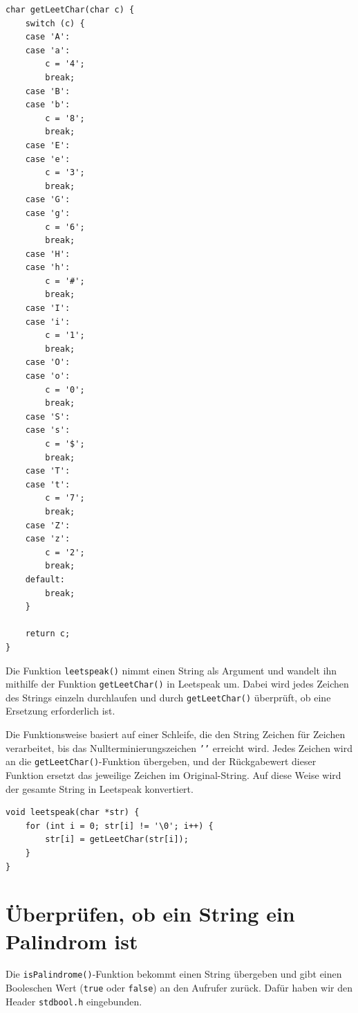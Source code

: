 \begin{verbatim}
char getLeetChar(char c) {
    switch (c) {
    case 'A':
    case 'a':
        c = '4';
        break;
    case 'B':
    case 'b':
        c = '8';
        break;
    case 'E':
    case 'e':
        c = '3';
        break;
    case 'G':
    case 'g':
        c = '6';
        break;
    case 'H':
    case 'h':
        c = '#';
        break;
    case 'I':
    case 'i':
        c = '1';
        break;
    case 'O':
    case 'o':
        c = '0';
        break;
    case 'S':
    case 's':
        c = '$';
        break;
    case 'T':
    case 't':
        c = '7';
        break;
    case 'Z':
    case 'z':
        c = '2';
        break;
    default:
        break;
    }

    return c;
}
\end{verbatim}

Die Funktion \texttt{leetspeak()} nimmt einen String als Argument und
wandelt ihn mithilfe der Funktion \texttt{getLeetChar()} in Leetspeak um.
Dabei wird jedes Zeichen des Strings einzeln durchlaufen und durch
\texttt{getLeetChar()} überprüft, ob eine Ersetzung erforderlich ist.

Die Funktionsweise basiert auf einer Schleife, die den String Zeichen für
Zeichen verarbeitet, bis das Nullterminierungszeichen \texttt{'\0'}
erreicht wird. Jedes Zeichen wird an die \texttt{getLeetChar()}-Funktion
übergeben, und der Rückgabewert dieser Funktion ersetzt das jeweilige Zeichen im
Original-String. Auf diese Weise wird der gesamte String in Leetspeak
konvertiert.

\begin{verbatim}
void leetspeak(char *str) {
    for (int i = 0; str[i] != '\0'; i++) {
        str[i] = getLeetChar(str[i]);
    }
}
\end{verbatim}










\chapter{Überprüfen, ob ein String ein Palindrom ist}

Die \texttt{isPalindrome()}-Funktion bekommt einen String übergeben und
gibt einen Booleschen Wert (\texttt{true} oder \texttt{false}) an
den Aufrufer zurück. Dafür haben wir den Header \texttt{stdbool.h}
eingebunden.

